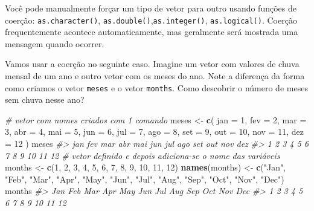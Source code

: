 \documentclass[]{book}
\newenvironment{Shaded}{\begin{snugshade}}{\end{snugshade}}
\newcommand{\KeywordTok}[1]{\textcolor[rgb]{0.13,0.29,0.53}{\textbf{#1}}}
\newcommand{\DataTypeTok}[1]{\textcolor[rgb]{0.13,0.29,0.53}{#1}}
\newcommand{\DecValTok}[1]{\textcolor[rgb]{0.00,0.00,0.81}{#1}}
\newcommand{\StringTok}[1]{\textcolor[rgb]{0.31,0.60,0.02}{#1}}
\newcommand{\CommentTok}[1]{\textcolor[rgb]{0.56,0.35,0.01}{\textit{#1}}}
\newcommand{\NormalTok}[1]{#1}
\begin{document}
Você pode manualmente forçar um tipo de vetor para outro usando funções
de coerção: \texttt{as.character()},
\texttt{as.double()},\texttt{as.integer()}, \texttt{as.logical()}.
Coerção frequentemente acontece automaticamente, mas geralmente será
mostrada uma mensagem quando ocorrer.

Vamos usar a coerção no seguinte caso. Imagine um vetor com valores de
chuva mensal de um ano e outro vetor com os meses do ano. Note a
diferença da forma como criamos o vetor \texttt{meses} e o vetor
\texttt{months}. Como descobrir o número de meses sem chuva nesse ano?

\begin{Shaded}
\begin{Highlighting}[]
\CommentTok{# vetor com nomes criados com 1 comando}
\NormalTok{meses <-}\StringTok{ }\KeywordTok{c}\NormalTok{(}
  \DataTypeTok{jan =} \DecValTok{1}\NormalTok{, }\DataTypeTok{fev =} \DecValTok{2}\NormalTok{, }\DataTypeTok{mar =} \DecValTok{3}\NormalTok{, }\DataTypeTok{abr =} \DecValTok{4}\NormalTok{, }\DataTypeTok{mai =} \DecValTok{5}\NormalTok{, }\DataTypeTok{jun =} \DecValTok{6}\NormalTok{,}
  \DataTypeTok{jul =} \DecValTok{7}\NormalTok{, }\DataTypeTok{ago =} \DecValTok{8}\NormalTok{, }\DataTypeTok{set =} \DecValTok{9}\NormalTok{, }\DataTypeTok{out =} \DecValTok{10}\NormalTok{, }\DataTypeTok{nov =} \DecValTok{11}\NormalTok{, }\DataTypeTok{dez =} \DecValTok{12}
\NormalTok{)}
\NormalTok{meses}
\CommentTok{#> jan fev mar abr mai jun jul ago set out nov dez }
\CommentTok{#>   1   2   3   4   5   6   7   8   9  10  11  12}
\CommentTok{# vetor definido e depois adiciona-se o nome das variáveis}
\NormalTok{months <-}\StringTok{ }\KeywordTok{c}\NormalTok{(}\DecValTok{1}\NormalTok{, }\DecValTok{2}\NormalTok{, }\DecValTok{3}\NormalTok{, }\DecValTok{4}\NormalTok{, }\DecValTok{5}\NormalTok{, }\DecValTok{6}\NormalTok{, }\DecValTok{7}\NormalTok{, }\DecValTok{8}\NormalTok{, }\DecValTok{9}\NormalTok{, }\DecValTok{10}\NormalTok{, }\DecValTok{11}\NormalTok{, }\DecValTok{12}\NormalTok{)}
\KeywordTok{names}\NormalTok{(months) <-}\StringTok{ }\KeywordTok{c}\NormalTok{(}\StringTok{"Jan"}\NormalTok{, }\StringTok{"Feb"}\NormalTok{, }\StringTok{"Mar"}\NormalTok{, }\StringTok{"Apr"}\NormalTok{, }\StringTok{"May"}\NormalTok{, }\StringTok{"Jun"}\NormalTok{, }\StringTok{"Jul"}\NormalTok{, }\StringTok{"Aug"}\NormalTok{, }\StringTok{"Sep"}\NormalTok{, }\StringTok{"Oct"}\NormalTok{, }\StringTok{"Nov"}\NormalTok{, }\StringTok{"Dec"}\NormalTok{)}
\NormalTok{months}
\CommentTok{#> Jan Feb Mar Apr May Jun Jul Aug Sep Oct Nov Dec }
\CommentTok{#>   1   2   3   4   5   6   7   8   9  10  11  12}

\end{Highlighting}
\end{Shaded}
\end{document}
